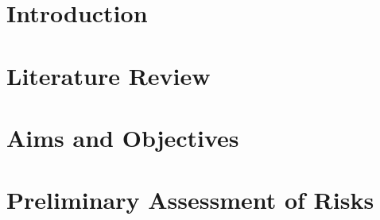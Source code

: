 \documentclass[a4paper,12pt]{article}
\begin{document}
	
	\section{Introduction}
	
	\section{Literature Review}
	
	\section{Aims and Objectives}
	
	
	\section{Preliminary Assessment of Risks}
	
	
	\newpage
	
	\printbibliography
	
\end{document}
